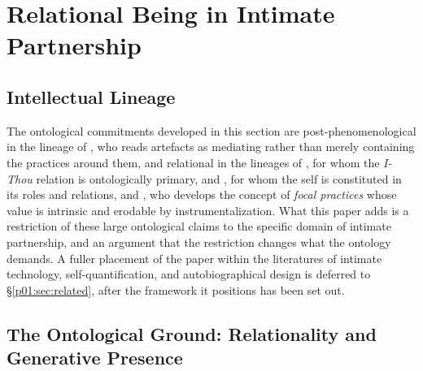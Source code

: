 \documentclass[11pt,a4paper]{article}
\begin{document}
\section{Relational Being in Intimate Partnership}\label{p01:sec:relational-being}

\subsection{Intellectual Lineage}\label{p01:sec:lineage}

The ontological commitments developed in this section are post-phenomenological in the lineage of \textcite{verbeek2005things}, who reads artefacts as mediating rather than merely containing the practices around them, and relational in the lineages of \textcite{buber1937iandthou}, for whom the \emph{I-Thou} relation is ontologically primary, \textcite{ames2011confucian} and \textcite{tu1985confucian}, for whom the self is constituted in its roles and relations, and \textcite{borgmann1984technology}, who develops the concept of \emph{focal practices} whose value is intrinsic and erodable by instrumentalization. What this paper adds is a restriction of these large ontological claims to the specific domain of intimate partnership, and an argument that the restriction changes what the ontology demands. A fuller placement of the paper within the literatures of intimate technology, self-quantification, and autobiographical design is deferred to §\ref{p01:sec:related}, after the framework it positions has been set out.

\subsection{The Ontological Ground: Relationality and Generative Presence}\label{p01:sec:ontology}
\end{document}
